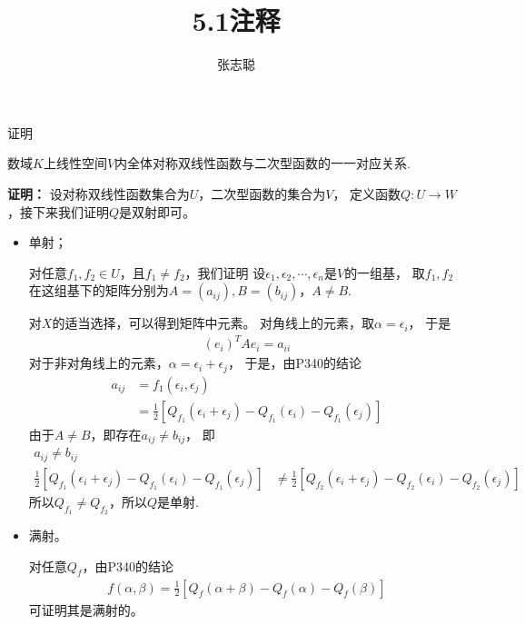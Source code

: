 \documentclass{article}
\begin{document}
\title{5.1注释}
\author{张志聪}
\maketitle

\begin{zremark}
  证明

  数域$K$上线性空间$V$内全体对称双线性函数与二次型函数的一一对应关系.
\end{zremark}
\textbf{证明：}
设对称双线性函数集合为$U$，二次型函数的集合为$V$，
定义函数$Q: U \to W$，接下来我们证明$Q$是双射即可。

\begin{itemize}
  \item 单射；

        对任意$f_1, f_2 \in U$，且$f_1 \neq f_2$，我们证明
        设$\epsilon_1, \epsilon_2, \cdots, \epsilon_n$是$V$的一组基，
        取$f_1, f_2$在这组基下的矩阵分别为$A = (a_{ij}), B = (b_{ij})$，$A \neq B$.

        对$X$的适当选择，可以得到矩阵中元素。
        对角线上的元素，取$\alpha = \epsilon_i$，
        于是
        \begin{align*}
          (e_i)^T A e_i = a_{ii}
        \end{align*}
        对于非对角线上的元素，$\alpha = \epsilon_i + \epsilon_j$，
        于是，由P340的结论
        \begin{align*}
          a_{ij}
           & = f_1(\epsilon_i, \epsilon_j)                                                                \\
           & = \frac{1}{2} [Q_{f_1}(\epsilon_i + \epsilon_j) - Q_{f_1}(\epsilon_i) - Q_{f_1}(\epsilon_j)]
        \end{align*}
        由于$A \neq B$，即存在$a_{ij} \neq b_{ij}$，
        即
        \begin{align*}
          a_{ij} \neq b_{ij}                                                                                 \\
          \frac{1}{2} [Q_{f_1}(\epsilon_i + \epsilon_j) - Q_{f_1}(\epsilon_i) - Q_{f_1}(\epsilon_j)]
           & \neq \frac{1}{2} [Q_{f_2}(\epsilon_i + \epsilon_j) - Q_{f_2}(\epsilon_i) - Q_{f_2}(\epsilon_j)]
        \end{align*}
        所以$Q_{f_1} \neq Q_{f_2}$，所以$Q$是单射.
  \item 满射。

        对任意$Q_f$，由P340的结论
        \begin{align*}
          f(\alpha, \beta) = \frac{1}{2} [Q_f(\alpha + \beta) - Q_f(\alpha) - Q_f(\beta)]
        \end{align*}
        可证明其是满射的。

\end{itemize}
\end{document}
